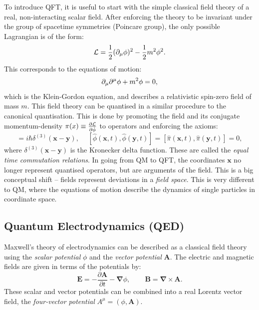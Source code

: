 To introduce QFT, it is useful to start with the simple classical field theory of a real, non-interacting scalar field. After enforcing the theory to be invariant under the group of spacetime symmetries (Poincare group), the only possible Lagrangian is of the form:
\begin{equation}\label{eq:kg}
    \mathcal{L}=\frac{1}{2}(\partial_\mu\phi)^2-\frac{1}{2}m^2\phi^2.
\end{equation}
This corresponds to the equations of motion:
\begin{equation}\label{eq:kgeom}
    \partial_\mu\partial^\mu\phi+m^2\phi=0,
\end{equation}
which is the Klein-Gordon equation, and describes a relativistic spin-zero field of mass $m$. This field theory can be quantised in a similar procedure to the canonical quantisation. This is done by promoting the field and its conjugate momentum-density $\pi(x)\equiv\frac{\partial\mathcal{L}}{\partial\dot{\phi}}$ to operators and enforcing the axioms:
\begin{equation}
    [\hat{\phi}(\mathbf{x},t),\hat{\pi}(\mathbf{y},t)]=i\hbar\delta^{(3)}(\mathbf{x}-\mathbf{y}), \hspace{15pt} [\hat{\phi}(\mathbf{x},t),\hat{\phi}(\mathbf{y},t)]=[\hat{\pi}(\mathbf{x},t),\hat{\pi}(\mathbf{y},t)]=0,
\end{equation}
where $\delta^{(3)}(\mathbf{x}-\mathbf{y})$ is the Kronecker delta function. These are called the \textit{equal time commutation relations}. In going from QM to QFT, the coordinates $\mathbf{x}$ no longer represent quantised operators, but are arguments of the field. This is a big conceptual shift -- fields represent deviations in a \textit{field space}. This is very different to QM, where the equations of motion describe the dynamics of single particles in coordinate space.

\subsection{Quantum Electrodynamics (QED)}

Maxwell's theory of electrodynamics can be described as a classical field theory using the \textit{scalar potential} $\phi$ and the \textit{vector potential} $\mathbf{A}$. The electric and magnetic fields are given in terms of the potentials by:
\begin{equation}
    \mathbf{E}=-\frac{\partial\mathbf{A}}{\partial t}-\mathbf{\nabla}\phi,\hspace{25pt}\mathbf{B}=\mathbf{\nabla}\times\mathbf{A}.
\end{equation}
These scalar and vector potentials can be combined into a real Lorentz vector field, the \textit{four-vector potential} $A^\mu=(\phi,\mathbf{A})$. 

